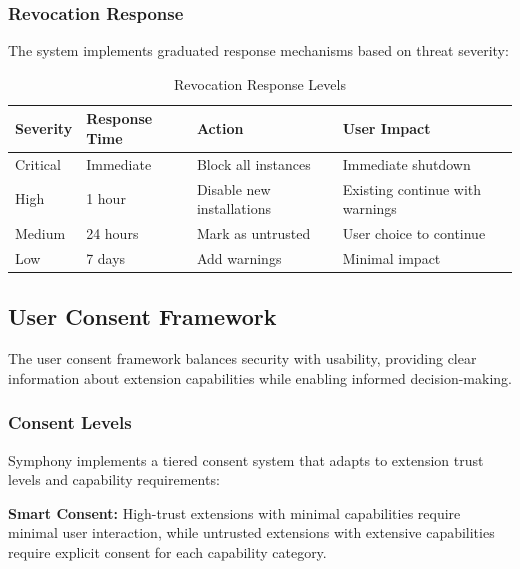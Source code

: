 \subsubsection{Revocation Response}
\label{subsubsec:revocation-response}

The system implements graduated response mechanisms based on threat severity:

\begin{table}[h]
\centering
\caption{Revocation Response Levels}
\label{tab:revocation-response-levels}
\begin{tabular}{@{}llll@{}}
\toprule
\textbf{Severity} & \textbf{Response Time} & \textbf{Action} & \textbf{User Impact} \\
\midrule
Critical & Immediate & Block all instances & Immediate shutdown \\
High & 1 hour & Disable new installations & Existing continue with warnings \\
Medium & 24 hours & Mark as untrusted & User choice to continue \\
Low & 7 days & Add warnings & Minimal impact \\
\bottomrule
\end{tabular}
\end{table}

\subsection{User Consent Framework}
\label{subsec:user-consent-framework}

The user consent framework balances security with usability, providing clear information about extension capabilities while enabling informed decision-making.

\subsubsection{Consent Levels}
\label{subsubsec:consent-levels}

Symphony implements a tiered consent system that adapts to extension trust levels and capability requirements:

\begin{successbox}
\textbf{Smart Consent:} High-trust extensions with minimal capabilities require minimal user interaction, while untrusted extensions with extensive capabilities require explicit consent for each capability category.
\end{successbox}

